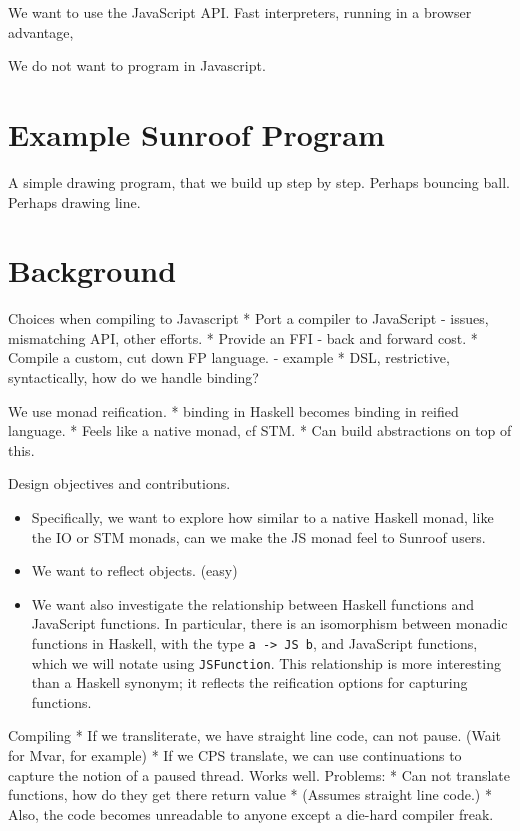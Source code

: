 \documentclass{llncs}
\begin{document}
We want to use the JavaScript API. Fast interpreters,
running in a browser advantage, 

We do not want to program in Javascript.

\section{Example Sunroof Program}

A simple drawing program, that we build up step by step.
Perhaps bouncing ball.
Perhaps drawing line.

\section{Background}

Choices when compiling to Javascript
 * Port a compiler to JavaScript - issues, mismatching API, other efforts.
 * Provide an FFI - back and forward cost.
 * Compile a custom, cut down FP language. - example
 * DSL, restrictive, syntactically, how do we handle binding?

We use monad reification.
 * binding in Haskell becomes binding in reified language.
 * Feels like a native monad, cf STM.
 * Can build abstractions on top of this.

Design objectives and contributions.
\begin{itemize}
\item 
Specifically, we want to explore how similar to a native Haskell monad,
like the IO or STM monads, can we make the JS monad feel to Sunroof users.
\item We want to reflect objects. (easy)

\item We want also investigate the relationship between Haskell functions
and JavaScript functions. In particular, there is an isomorphism
between monadic functions in Haskell, with the type \verb|a -> JS b|,
and JavaScript functions, which we will notate using \verb|JSFunction|.
This relationship is more interesting than a Haskell synonym;
it reflects the reification options for capturing functions.
\end{itemize}

 
Compiling
 * If we transliterate, we have straight line code, can not pause.
    (Wait for Mvar, for example)
 * If we CPS translate, we can use continuations to capture the
   notion of a paused thread. Works well.
   Problems:
     * Can not translate functions, how do they get there return value
     * (Assumes straight line code.)
     * Also, the code becomes unreadable to anyone except a die-hard 
       compiler freak.
 
\end{document}
